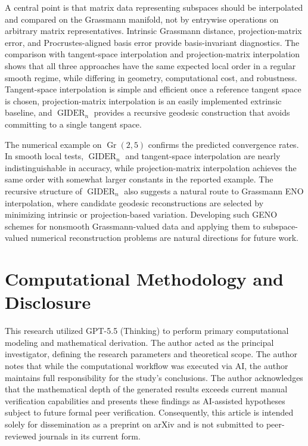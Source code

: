\documentclass[a4paper,11pt]{article}
\DeclareMathOperator{\Gr}{Gr}
\newcommand{\GIDER}{\operatorname{GIDER}}
\numberwithin{equation}{section}
\theoremstyle{plain}
\theoremstyle{definition}
\theoremstyle{remark}
\begin{document}
A central point is that matrix data representing subspaces should be interpolated and compared on the Grassmann manifold, not by entrywise operations on arbitrary matrix representatives.  Intrinsic Grassmann distance, projection-matrix error, and Procrustes-aligned basis error provide basis-invariant diagnostics.  The comparison with tangent-space interpolation and projection-matrix interpolation shows that all three approaches have the same expected local order in a regular smooth regime, while differing in geometry, computational cost, and robustness.  Tangent-space interpolation is simple and efficient once a reference tangent space is chosen, projection-matrix interpolation is an easily implemented extrinsic baseline, and \(\GIDER_n\) provides a recursive geodesic construction that avoids committing to a single tangent space.

The numerical example on \(\Gr(2,5)\) confirms the predicted convergence rates.  In smooth local tests, \(\GIDER_n\) and tangent-space interpolation are nearly indistinguishable in accuracy, while projection-matrix interpolation achieves the same order with somewhat larger constants in the reported example.  The recursive structure of \(\GIDER_n\) also suggests a natural route to Grassmann ENO interpolation, where candidate geodesic reconstructions are selected by minimizing intrinsic or projection-based variation.  Developing such GENO schemes for nonsmooth Grassmann-valued data and applying them to subspace-valued numerical reconstruction problems are natural directions for future work.


\section*{Computational Methodology and Disclosure}

This research utilized GPT-5.5 (Thinking) to perform primary computational modeling and mathematical derivation. The author acted as the principal investigator, defining the research parameters and theoretical scope. The author notes that while the computational workflow was executed via AI, the author maintains full responsibility for the study's conclusions. The author acknowledges that the mathematical depth of the generated results exceeds current manual verification capabilities and presents these findings as AI-assisted hypotheses subject to future formal peer verification. Consequently, this article is intended solely for dissemination as a preprint on arXiv and is not submitted to peer-reviewed journals in its current form.
\end{document}
